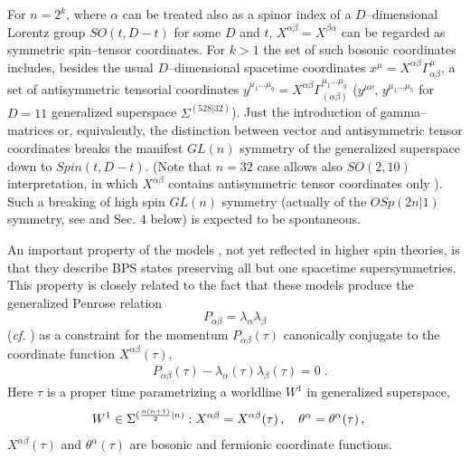 \documentclass[a4paper,11pt]{article}
\begin{document}
For $n=2^k$, where $\alpha$ can be treated also as a spinor index 
of a $D$--dimensional 
Lorentz group $SO(t,D-t)$ for some $D$ and $t$,  
$X^{\alpha\beta}=X^{\beta\alpha}$ 
can be regarded as symmetric spin--tensor coordinates.  
For  $k>1$ the set of such bosonic coordinates includes, 
besides the usual $D$--dimensional spacetime 
coordinates $x^\mu = X^{\alpha\beta} \Gamma^\mu_{\alpha\beta}$, a set of
antisymmetric tensorial coordinates 
$y^{\mu_1 \ldots \mu_q}= X^{\alpha\beta} 
\Gamma^{\mu_1 \ldots \mu_q}_{(\alpha\beta )}$ 
($y^{\mu \nu}$, $y^{\mu_1\ldots \mu_5}$ for $D=11$ generalized  superspace 
$\Sigma^{(528|32)}$). Just the introduction of gamma--matrices or, 
equivalently, the distinction between vector and antisymmetric tensor 
coordinates  breaks the manifest $GL(n)$ symmetry of the generalized 
superspace down to $Spin(t,D-t)$.  
(Note that $n=32$ case allows also $SO(2,10)$ interpretation, in which 
$X^{\alpha\beta}$ contains antisymmetric tensor coordinates only 
\cite{Bars,RS,Manvelyan}).   
Such a breaking of high spin $GL(n)$ symmetry (actually of the 
$OSp(2n|1)$ symmetry, 
see \cite{V01,V01s,V01c,BL98,BLS99} and 
Sec. 4 below) 
is expected to be spontaneous. 

An important property of the models \cite{BL98,BL98'}, 
not yet 
reflected in higher spin theories, is that they 
describe BPS states preserving all but one spacetime supersymmetries. 
This property is closely related to the fact 
that these models produce the generalized Penrose relation 
\begin{equation}\label{Pll}
P_{\alpha\beta} = \lambda_{\alpha} \lambda_{\beta} 
\end{equation} 
({\it cf.} \cite{Pen}) 
as a constraint for the momentum $P_{\alpha\beta}(\tau)$ canonically 
conjugate to the coordinate function $X^{\alpha\beta}(\tau)$, 
\begin{eqnarray}\label{Pll0}
& P_{\alpha\beta}(\tau) - \lambda_{\alpha}(\tau) \lambda_{\beta} (\tau)=0\; .
 \end{eqnarray} 
Here $\tau$ is a proper time parametrizing   
a worldline $W^1$ 
in generalized superspace, 
\begin{eqnarray}\label{W1} 
W^1 \in \Sigma^{({n(n+1)\over 2}|n)}: & \;   
X^{\alpha\beta}=X^{\alpha\beta}(\tau)  \, , \quad  
\theta^{\alpha}=\theta^{\alpha}(\tau)\, ,   
\end{eqnarray}
$X^{\alpha\beta}(\tau)$ and $\theta^{\alpha}(\tau)$ are bosonic 
and  fermionic coordinate functions.  
\end{document}
